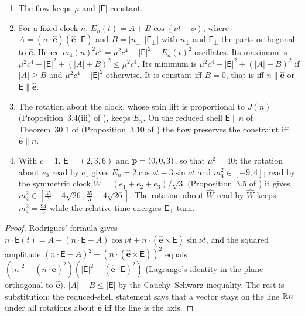 \begin{proposition}
\label{e6:prop:clock}
\begin{enumerate}[label=(\roman*),leftmargin=2.2em]
\item The flow keeps $\mu$ and $|\boldsymbol{\mathsf E}|$ constant.
\item For a fixed clock $n$, $E_n(t)=A+B\cos(\nu t-\phi)$, where $A=(n\cdot\hat{\mathbf e})(\hat{\mathbf e}\cdot\boldsymbol{\mathsf E})$ and
$B=|n_\perp|\,|\boldsymbol{\mathsf E}_\perp|$ with $n_\perp$ and $\boldsymbol{\mathsf E}_\perp$ the parts orthogonal to $\hat{\mathbf e}$. Hence $m_4(n)^2c^4=\mu^2c^4-|\boldsymbol{\mathsf E}|^2+E_n(t)^2$ oscillates. Its maximum is
$\mu^2c^4-|\boldsymbol{\mathsf E}|^2+(|A|+B)^2\le\mu^2c^4$. Its minimum is $\mu^2c^4-|\boldsymbol{\mathsf E}|^2+(|A|-B)^2$ if $|A|\ge B$ and
$\mu^2c^4-|\boldsymbol{\mathsf E}|^2$ otherwise. It is constant iff $B=0$, that is iff $n\parallel\hat{\mathbf e}$ or $\boldsymbol{\mathsf E}\parallel\hat{\mathbf e}$.
\item The rotation about the clock, whose spin lift is proportional to $J(n)$ (Proposition~3.4(iii) of \cite{TR}), keeps $E_n$. On the reduced shell
$\boldsymbol{\mathsf E}\parallel n$ of Theorem~30.1 of \cite{ES17} (Proposition~3.10 of \cite{TR}) the flow preserves the constraint iff $\hat{\mathbf e}\parallel n$.
\item With $c=1$, $\boldsymbol{\mathsf E}=(2,3,6)$ and $\mathbf p=(0,0,3)$, so that $\mu^2=40$: the rotation about $e_3$ read by $e_1$ gives $E_n=2\cos\nu t-3\sin\nu t$ and
$m_4^2\in[-9,4]$; read by the symmetric clock $\widehat W=(e_1+e_2+e_3)/\sqrt3$ (Proposition~3.5 of \cite{ES17}) it gives $m_4^2\in[\tfrac{35}3-4\sqrt{26},\tfrac{35}3+4\sqrt{26}]$. The rotation about $\widehat W$ read by $\widehat W$ keeps
$m_4^2=\tfrac{94}3$ while the relative-time energies $\boldsymbol{\mathsf E}_\perp$ turn.
\end{enumerate}
\end{proposition}

\begin{proof}
Rodrigues' formula gives $n\cdot\boldsymbol{\mathsf E}(t)=A+(n\cdot\boldsymbol{\mathsf E}-A)\cos\nu t+n\cdot(\hat{\mathbf e}\times\boldsymbol{\mathsf E})\sin\nu t$, and the squared
amplitude $(n\cdot\boldsymbol{\mathsf E}-A)^2+(n\cdot(\hat{\mathbf e}\times\boldsymbol{\mathsf E}))^2$ equals $(|n|^2-(n\cdot\hat{\mathbf e})^2)(|\boldsymbol{\mathsf E}|^2-(\hat{\mathbf e}\cdot\boldsymbol{\mathsf E})^2)$
(Lagrange's identity in the plane orthogonal to $\hat{\mathbf e}$). $|A|+B\le|\boldsymbol{\mathsf E}|$ by the Cauchy--Schwarz inequality. The rest is
substitution; the reduced-shell statement says that a vector stays on the line $\mathbb{R} n$ under all rotations about $\hat{\mathbf e}$ iff the line is the axis.
\end{proof}

